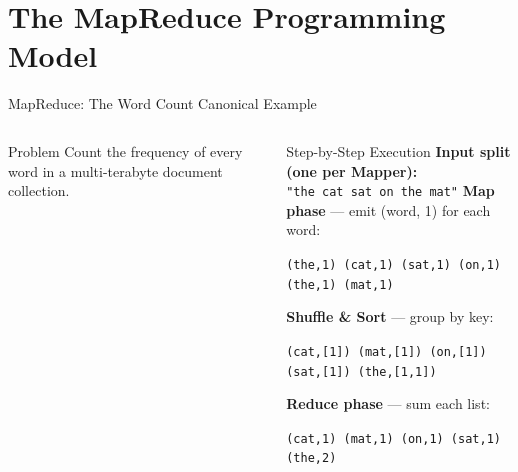 \documentclass[aspectratio=169,10pt]{beamer}
\begin{document}
\section{The MapReduce Programming Model}

\begin{frame}[fragile]{MapReduce: The Word Count Canonical Example}
  \begin{columns}[T]
      \begin{block}{Problem}
        Count the frequency of every word in a multi-terabyte document collection.
      \end{block}
      \vspace{4pt}
      \begin{exampleblock}{Step-by-Step Execution}
        \textbf{Input split (one per Mapper):}\\
        \texttt{\small "the cat sat on the mat"}
        \vspace{4pt}
        \textbf{Map phase} — emit (word, 1) for each word:
        \begin{center}
        \texttt{\scriptsize (the,1) (cat,1) (sat,1) (on,1) (the,1) (mat,1)}
        \end{center}
        \textbf{Shuffle \& Sort} — group by key:
        \begin{center}
        \texttt{\scriptsize (cat,[1]) (mat,[1]) (on,[1]) (sat,[1]) (the,[1,1])}
        \end{center}
        \textbf{Reduce phase} — sum each list:
        \begin{center}
        \texttt{\scriptsize (cat,1) (mat,1) (on,1) (sat,1) (the,2)}
        \end{center}
      \end{exampleblock}


\end{columns}
\end{frame}
\end{document}
